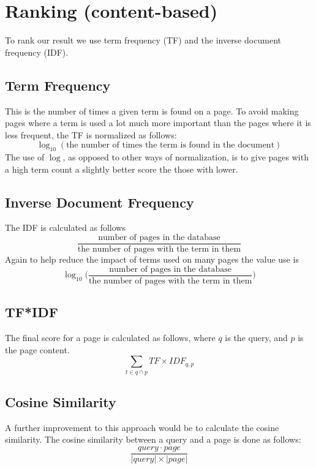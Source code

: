 \section{Ranking (content-based)}
To rank our result we use term frequency (TF) and the inverse document frequency (IDF).

\subsection{Term Frequency}
This is the number of times a given term is found on a page. To avoid making pages where a term is used a lot much more important than the pages where it is less frequent, the TF is normalized as follows:
\[
    \log_{10}(\text{the number of times the term is found in the document})
\]
The use of $\log$, as opposed to other ways of normalization, is to give pages with a high term count a slightly better score the those with lower.

\subsection{Inverse Document Frequency}
The IDF is calculated as follows
\[
    \frac{ \text{number of pages in the database}}{ \text{the number of pages with the term in them}}
\]
Again to help reduce the impact of terms used on many pages the value use is
\[
    \log_{10}\Big(\frac{ \text{number of pages in the database}}{ \text{the number of pages with the term in them}}\Big)
\]

\subsection{TF*IDF}
The final score for a page is calculated as follows, where $q$ is the query, and $p$ is the page content.
\[
    \sum_{t \in q \cap p}{TF \times IDF_{q,p}}
\]
\subsection{Cosine Similarity}
A further improvement to this approach would be to calculate the cosine similarity. The cosine similarity between a query and a page is done as follows:
\[
    \frac{query \cdot page}{|query| \times |page|}
\]


 